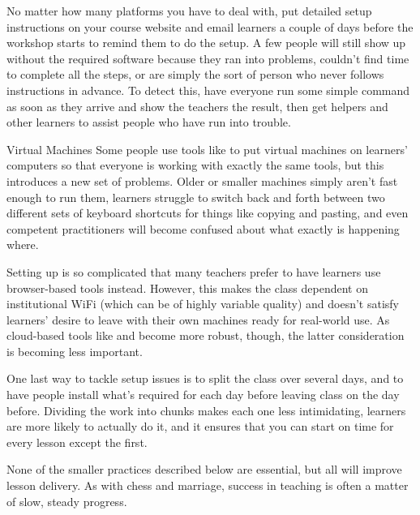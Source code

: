 No matter how many platforms you have to deal with,
put detailed setup instructions on your course website
and email learners a couple of days before the workshop starts
to remind them to do the setup.
A few people will still show up without the required software because
they ran into problems,
couldn't find time to complete all the steps,
or are simply the sort of person who never follows instructions in advance.
To detect this,
have everyone run some simple command as soon as they arrive
and show the teachers the result,
then get helpers and other learners
to assist people who have run into trouble.

\begin{aside}{Virtual Machines}
  Some people use tools like 
  to put virtual machines on learners' computers
  so that everyone is working with exactly the same tools,
  but this introduces a new set of problems.
  Older or smaller machines simply aren't fast enough to run them,
  learners struggle to switch back and forth
  between two different sets of keyboard shortcuts for things like copying and pasting,
  and even competent practitioners will become confused about what exactly is happening where.
\end{aside}

Setting up is so complicated that
many teachers prefer to have learners use browser-based tools instead.
However,
this makes the class dependent on institutional WiFi
(which can be of highly variable quality)
and doesn't satisfy learners' desire to leave with their own machines ready for real-world use.
As cloud-based tools like 
and  become more robust,
though,
the latter consideration is becoming less important.

One last way to tackle setup issues is to split the class over several days,
and to have people install what's required for each day
before leaving class on the day before.
Dividing the work into chunks makes each one less intimidating,
learners are more likely to actually do it,
and it ensures that you can start on time for every lesson except the first.


None of the smaller practices described below are essential,
but all will improve lesson delivery.
As with chess and marriage,
success in teaching is often a matter of slow, steady progress.

